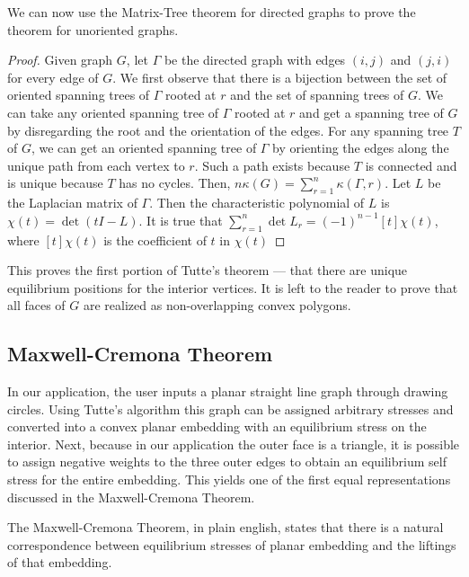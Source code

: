 \documentclass[11pt]{article}
\theoremstyle{definition}
\begin{document}
	We can now use the Matrix-Tree theorem for directed graphs to prove the theorem for unoriented graphs.
	
	\begin{proof}
		Given graph $G$, let $\Gamma$ be the directed graph with edges $(i,j)$ and $(j,i)$ for every edge of $G$. 
		We first observe that there is a bijection between the set of oriented spanning trees of $\Gamma$ rooted at $r$ and the set of spanning trees of $G$. 
		We can take any oriented spanning tree of $\Gamma$ rooted at $r$ and get a spanning tree of $G$ by disregarding the root and the orientation of the edges. 
		For any spanning tree $T$ of $G$, we can get an oriented spanning tree of $\Gamma$ by orienting the edges along the unique path from each vertex to $r$. 
		Such a path exists because $T$ is connected and is unique because $T$ has no cycles. 
		Then, $n \kappa(G) = \sum_{r=1}^{n} \kappa(\Gamma, r)$.
		Let $L$ be the Laplacian matrix of $\Gamma$.
		Then the characteristic polynomial of $L$ is $\chi(t) = \det(tI - L)$.
		It is true that $\sum_{r=1}^{n} \det L_r = (-1)^{n-1} [t]\chi(t)$, where $[t]\chi(t)$ is the coefficient of $t$ in $\chi(t)$
	\end{proof}
	
	This proves the first portion of Tutte's theorem --- that there are unique equilibrium positions for the interior vertices.
	It is left to the reader to prove that all faces of $G$ are realized as non-overlapping convex polygons. 	
	
	
\subsection{Maxwell-Cremona Theorem}
In our application, the user inputs a planar straight line graph through drawing circles. Using Tutte's algorithm this graph can be assigned arbitrary stresses and converted into a convex planar embedding with an equilibrium stress on the interior. Next, because in our application the outer face is a triangle, it is possible to assign negative weights to the three outer edges to obtain an equilibrium self stress for the entire embedding. This yields one of the first equal representations discussed in the Maxwell-Cremona Theorem.

 The Maxwell-Cremona Theorem, in plain english, states that there is a natural correspondence between equilibrium stresses of planar embedding and the liftings of that embedding.
 
\end{document}
